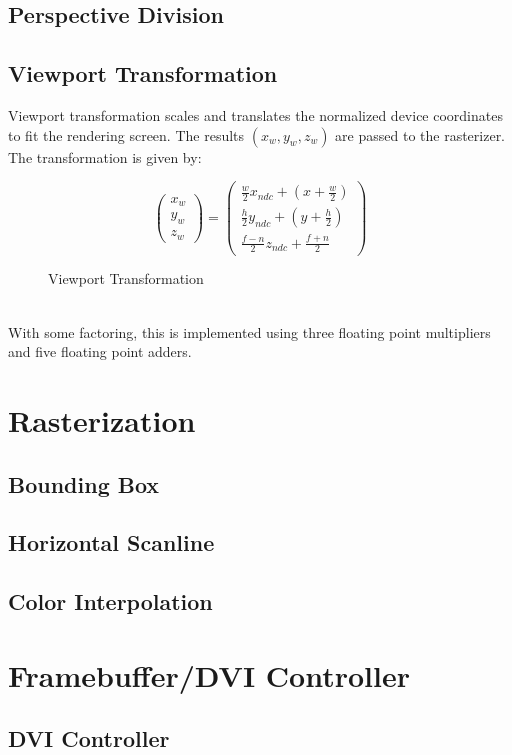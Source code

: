 \documentclass[letterpaper,10pt]{article}
\begin{document}
\subsection{Perspective Division}

\subsection{Viewport Transformation}
Viewport transformation scales and translates the normalized device coordinates to fit the rendering screen. The results $(x_{w},y_{w},z_{w})$ are passed to the rasterizer. The transformation is given by: \\
\begin{figure}[h]
\[
\begin{pmatrix}
x_{w} \\
y_{w} \\
z_{w}
\end{pmatrix}
=
\begin{pmatrix}
\frac{w}{2}x_{ndc}+(x+\frac{w}{2}) \\
\frac{h}{2}y_{ndc}+(y+\frac{h}{2})  \\
\frac{f-n}{2}z_{ndc}+\frac{f+n}{2}
\end{pmatrix}
\]
\caption{Viewport Transformation}
\end{figure}\\
With some factoring, this is implemented using three floating point multipliers and five floating point adders.

\section{Rasterization}
\subsection{Bounding Box}
\subsection{Horizontal Scanline}
\subsection{Color Interpolation}

\section{Framebuffer/DVI Controller}

\subsection{DVI Controller}
\end{document}
